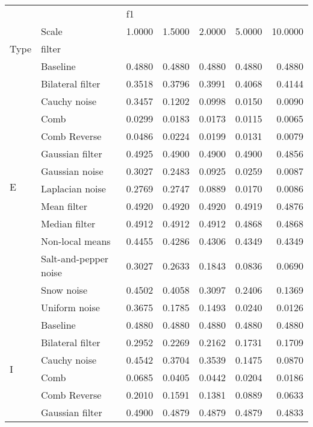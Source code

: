 \begin{tabular}{llrrrrr}
\toprule
  & {} & \multicolumn{5}{l}{f1} \\
  & Scale & 1.0000  & 1.5000  & 2.0000  & 5.0000  & 10.0000 \\
Type & filter &         &         &         &         &         \\
\midrule
\multirow{14}{*}{E} & Baseline &  0.4880 &  0.4880 &  0.4880 &  0.4880 &  0.4880 \\
  & Bilateral filter &  0.3518 &  0.3796 &  0.3991 &  0.4068 &  0.4144 \\
  & Cauchy noise &  0.3457 &  0.1202 &  0.0998 &  0.0150 &  0.0090 \\
  & Comb &  0.0299 &  0.0183 &  0.0173 &  0.0115 &  0.0065 \\
  & Comb Reverse &  0.0486 &  0.0224 &  0.0199 &  0.0131 &  0.0079 \\
  & Gaussian filter &  0.4925 &  0.4900 &  0.4900 &  0.4900 &  0.4856 \\
  & Gaussian noise &  0.3027 &  0.2483 &  0.0925 &  0.0259 &  0.0087 \\
  & Laplacian noise &  0.2769 &  0.2747 &  0.0889 &  0.0170 &  0.0086 \\
  & Mean filter &  0.4920 &  0.4920 &  0.4920 &  0.4919 &  0.4876 \\
  & Median filter &  0.4912 &  0.4912 &  0.4912 &  0.4868 &  0.4868 \\
  & Non-local means &  0.4455 &  0.4286 &  0.4306 &  0.4349 &  0.4349 \\
  & Salt-and-pepper noise &  0.3027 &  0.2633 &  0.1843 &  0.0836 &  0.0690 \\
  & Snow noise &  0.4502 &  0.4058 &  0.3097 &  0.2406 &  0.1369 \\
  & Uniform noise &  0.3675 &  0.1785 &  0.1493 &  0.0240 &  0.0126 \\
\cline{1-7}
\multirow{14}{*}{I} & Baseline &  0.4880 &  0.4880 &  0.4880 &  0.4880 &  0.4880 \\
  & Bilateral filter &  0.2952 &  0.2269 &  0.2162 &  0.1731 &  0.1709 \\
  & Cauchy noise &  0.4542 &  0.3704 &  0.3539 &  0.1475 &  0.0870 \\
  & Comb &  0.0685 &  0.0405 &  0.0442 &  0.0204 &  0.0186 \\
  & Comb Reverse &  0.2010 &  0.1591 &  0.1381 &  0.0889 &  0.0633 \\
  & Gaussian filter &  0.4900 &  0.4879 &  0.4879 &  0.4879 &  0.4833 \\

\end{tabular}
